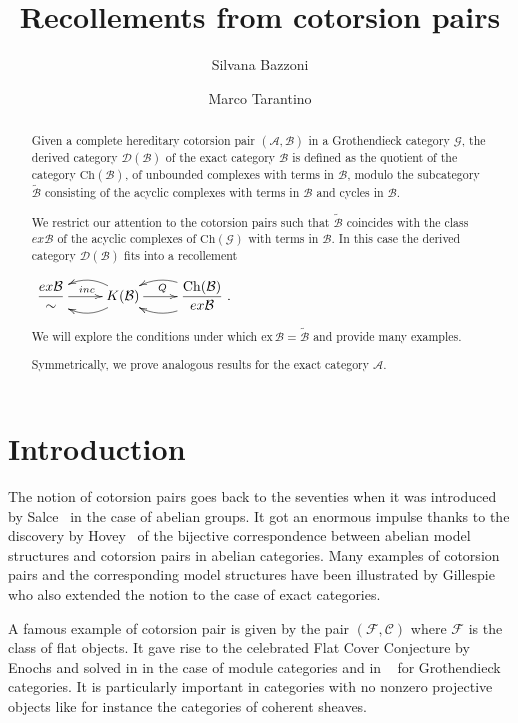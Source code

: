 \documentclass[11pt,a4paper,reqno]{amsart}
\title{Recollements from cotorsion pairs}
\author[S. Bazzoni]{Silvana Bazzoni}
\author[M.Tarantino]{Marco Tarantino}
\newcommand{\A}{\mathcal{A}}
\newcommand{\B}{\mathcal{B}}
\newcommand{\C}{\mathcal{C}}
\newcommand{\D}{\mathcal{D}}
\newcommand{\F}{\mathcal{F}}
\newcommand{\G}{\mathcal{G}}
\newcommand{\Ch}{\mathrm{Ch}}
\theoremstyle{plain}
\theoremstyle{definition}
\theoremstyle{remark}
\begin{document}
\begin{abstract} Given a complete hereditary cotorsion pair $(\mathcal{A},\mathcal{B})$ in a Grothendieck category $\mathcal{G}$,
the derived category $\D(\B)$ of the exact category $\B$ is defined as the quotient of the category $\Ch(\B)$, of unbounded complexes with terms in $\B$, modulo the subcategory $\widetilde{\B}$ consisting of the acyclic complexes with terms in $\B$ and cycles in $\B$.
%

We restrict our attention to the cotorsion pairs such that
$\widetilde{\mathcal{B}}$ coincides with the class $ex\B$ of the acyclic complexes of $\Ch(\G)$ with terms in $\B$. In this case the derived category $\D(\B)$
fits into a recollement

$
\xymatrix{\dfrac{ex\B}{\sim} \ar[r]^{inc} &{K(\B)} \ar@/^1pc/[l]\ar@/_1pc/[l] \ar[r]^{Q}
&{\dfrac{\Ch(\B)}{ex\B }}\ar@/^1pc/ [l] \ar@/_1pc/ [l] }
.$


%
We will explore the conditions under which $\mathrm{ex}\,\mathcal{B}=\widetilde{\mathcal{B}}$ and provide many examples.

Symmetrically, we prove analogous results for the exact category $\A$.

\end{abstract}

\maketitle


%
%
\setcounter{tocdepth}{1}
\tableofcontents


%
%
\section*{Introduction} The notion of cotorsion pairs goes back to the seventies when it was introduced by Salce~\cite{Sal} in the case of abelian groups.
It got an enormous impulse thanks to the discovery by Hovey~\cite{Hov07} of the bijective correspondence between abelian model structures and cotorsion pairs in abelian categories. Many examples of cotorsion pairs and the corresponding model structures have been illustrated by Gillespie \cite{G5} who also extended the notion to the case of exact categories.

A famous example of cotorsion pair is given by the pair $(\F, \C)$ where $\F$ is the class of flat objects. It gave rise to the celebrated Flat Cover Conjecture by Enochs and solved in \cite{BEE} in the case of module categories and in ~\cite{ElB} for Grothendieck categories. It is particularly important in categories with no nonzero projective objects like for instance the categories of coherent sheaves.
\end{document}
